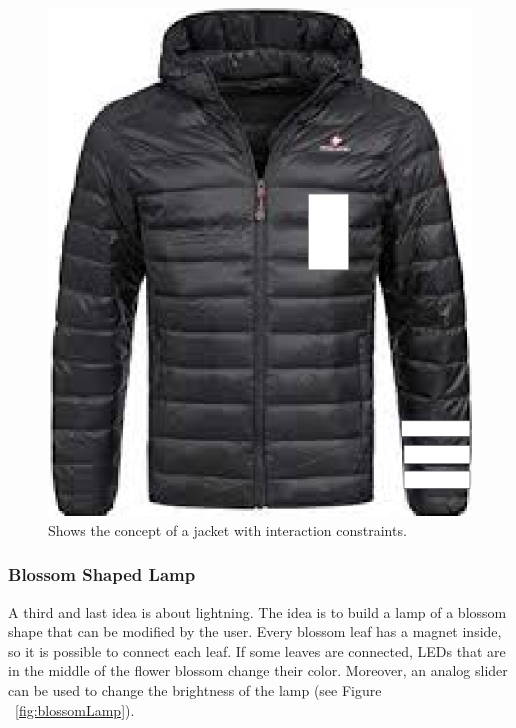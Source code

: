 \documentclass[04_projectProcess.tex]{subfiles}
\begin{document}
    \begin{figure}[h!]
        \centering
        \includegraphics[scale=0.2]{images/projectideas/jacket.png}
        \caption{Shows the concept of a jacket with interaction constraints.}
        \label{fig:jacketIdea}
    \end{figure}

    \subsubsection{Blossom Shaped Lamp}
    \label{BlossomShapedLamp}
    \begin{flushleft}
        A third and last idea is about lightning. The idea is to build a lamp of a blossom shape that 
        can be modified by the user. Every blossom leaf has a magnet inside, so it is possible to connect 
        each leaf. If some leaves are connected, LEDs that are in the middle of the flower blossom 
        change their color. Moreover, an analog slider can be used to change the brightness of the lamp 
        (see Figure ~\ref{fig:blossomLamp}).
    \end{flushleft}
\end{document}
